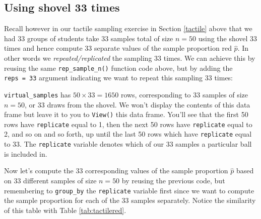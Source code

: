 \documentclass[12pt,]{krantz}
\makeatletter
\newenvironment{Shaded}{\begin{snugshade}}{\end{snugshade}}
\newcommand{\KeywordTok}[1]{\textcolor[rgb]{0.27,0.27,0.27}{\textbf{#1}}}
\newcommand{\DataTypeTok}[1]{\textcolor[rgb]{0.27,0.27,0.27}{#1}}
\newcommand{\DecValTok}[1]{\textcolor[rgb]{0.06,0.06,0.06}{#1}}
\newcommand{\StringTok}[1]{\textcolor[rgb]{0.5,0.5,0.5}{#1}}
\newcommand{\OperatorTok}[1]{\textcolor[rgb]{0.43,0.43,0.43}{\textbf{#1}}}
\newcommand{\NormalTok}[1]{#1}
\newenvironment{kframe}{%
\medskip{}
\setlength{\fboxsep}{.8em}
 \def\at@end@of@kframe{}%
 \ifinner\ifhmode%
  \def\at@end@of@kframe{\end{minipage}}%
  \begin{minipage}{\columnwidth}%
 \fi\fi%
 \def\FrameCommand##1{\hskip\@totalleftmargin \hskip-\fboxsep
 \colorbox{shadecolor}{##1}\hskip-\fboxsep
     \hskip-\linewidth \hskip-\@totalleftmargin \hskip\columnwidth}%
 \MakeFramed {\advance\hsize-\width
   \@totalleftmargin\z@ \linewidth\hsize
   \@setminipage}}%
 {\par\unskip\endMakeFramed%
 \at@end@of@kframe}
\renewenvironment{Shaded}{\begin{kframe}}{\end{kframe}}
\makeatother
\begin{document}
\subsection{Using shovel 33 times}\label{using-shovel-33-times}

Recall however in our tactile sampling exercise in Section \ref{tactile}
above that we had 33 groups of students take 33 samples total of size
\(n=50\) using the shovel 33 times and hence compute 33 separate values
of the sample proportion red \(\widehat{p}\). In other words we
\emph{repeated/replicated} the sampling 33 times. We can achieve this by
reusing the same \texttt{rep\_sample\_n()} function code above, but by
adding the \texttt{reps\ =\ 33} argument indicating we want to repeat
this sampling 33 times:

\begin{Shaded}
\end{Shaded}

\texttt{virtual\_samples} has \(50 \times 33 = 1650\) rows,
corresponding to 33 samples of size \(n=50\), or 33 draws from the
shovel. We won't display the contents of this data frame but leave it to
you to \texttt{View()} this data frame. You'll see that the first 50
rows have \texttt{replicate} equal to 1, then the next 50 rows have
\texttt{replicate} equal to 2, and so on and so forth, up until the last
50 rows which have \texttt{replicate} equal to 33. The
\texttt{replicate} variable denotes which of our 33 samples a particular
ball is included in.

Now let's compute the 33 corresponding values of the sample proportion
\(\widehat{p}\) based on 33 different samples of size \(n=50\) by
reusing the previous code, but remembering to \texttt{group\_by} the
\texttt{replicate} variable first since we want to compute the sample
proportion for each of the 33 samples separately. Notice the similarity
of this table with Table \ref{tab:tactilered}.

\begin{Shaded}
\end{Shaded}
\end{document}
